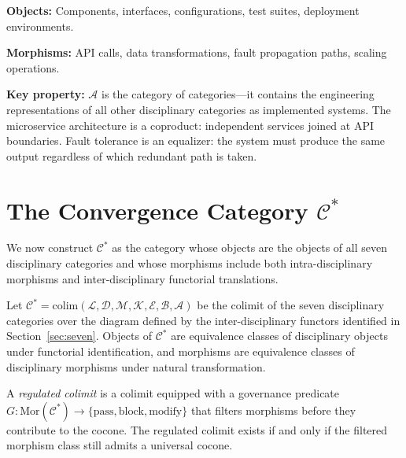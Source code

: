 \documentclass[11pt,a4paper]{article}
\begin{document}
\textbf{Objects:} Components, interfaces, configurations, test suites, deployment environments.

\textbf{Morphisms:} API calls, data transformations, fault propagation paths, scaling operations.

\textbf{Key property:} $\mathcal{A}$ is the category of categories---it contains the engineering representations of all other disciplinary categories as implemented systems. The microservice architecture is a coproduct: independent services joined at API boundaries. Fault tolerance is an equalizer: the system must produce the same output regardless of which redundant path is taken.

\section{The Convergence Category $\mathcal{C}^*$}
\label{sec:convergence}

We now construct $\mathcal{C}^*$ as the category whose objects are the objects of all seven disciplinary categories and whose morphisms include both intra-disciplinary morphisms and inter-disciplinary functorial translations.

\begin{definition}
Let $\mathcal{C}^* = \mathrm{colim}(\mathcal{L}, \mathcal{D}, \mathcal{M}, \mathcal{K}, \mathcal{E}, \mathcal{B}, \mathcal{A})$ be the colimit of the seven disciplinary categories over the diagram defined by the inter-disciplinary functors identified in Section~\ref{sec:seven}. Objects of $\mathcal{C}^*$ are equivalence classes of disciplinary objects under functorial identification, and morphisms are equivalence classes of disciplinary morphisms under natural transformation.
\end{definition}

\begin{definition}
A \emph{regulated colimit} is a colimit equipped with a governance predicate $G: \mathrm{Mor}(\mathcal{C}^*) \to \{\text{pass}, \text{block}, \text{modify}\}$ that filters morphisms before they contribute to the cocone. The regulated colimit exists if and only if the filtered morphism class still admits a universal cocone.
\end{definition}
\end{document}
